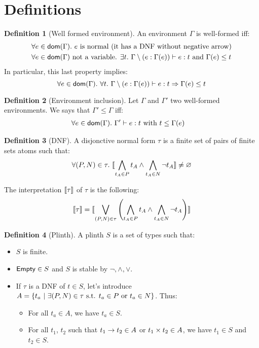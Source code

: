 \documentclass[a4paper]{article}
\theoremstyle{definition}
\newtheorem{definition}{Definition}
\begin{document}
    \section{Definitions}
      
    \begin{definition}[Well formed environment]
      An environment $\Gamma$ is well-formed iff:
      \begin{align*}
        &\forall e \in \textsf{dom}(\Gamma).\ e \text{ is normal (it has a DNF without negative arrow)}\\
        &\forall e \in \textsf{dom}(\Gamma) \text{ not a variable. } \exists t.\ \Gamma\setminus(e:\Gamma(e)) \vdash e : t \text{ and } \Gamma(e) \leq t
      \end{align*}
      In particular, this last property implies:
      \[
        \forall e \in \dom \Gamma.\ \forall t.\ \Gamma\setminus(e:\Gamma(e)) \vdash e : t \Rightarrow \Gamma(e) \leq t
      \]
    \end{definition}
  
    \begin{definition}[Environment inclusion]
      Let $\Gamma$ and $\Gamma'$ two well-formed environments. We says that $\Gamma' \leq \Gamma$ iff:
      \begin{align*}
        &\forall e \in \textsf{dom}(\Gamma).\ \Gamma' \vdash e : t \text{ with } t \leq \Gamma(e)
      \end{align*}
    \end{definition}

    \begin{definition}[DNF]
      A disjonctive normal form $\tau$ is a finite set of pairs of finite sets atoms such that:
      \[ \forall (P,N)\in \tau.\ {\llbracket \bigwedge_{t_A \in P} t_A \land \bigwedge_{t_A \in N} \neg t_A \rrbracket} \neq \varnothing \]

      The interpretation ${\llbracket \tau \rrbracket}$ of $\tau$ is the following:
      \[
        {\llbracket \tau \rrbracket} = {\llbracket \bigvee_{(P,N)\in \tau} \left(\bigwedge_{t_A \in P} t_A \land \bigwedge_{t_A \in N} \neg t_A \right) \rrbracket}
      \]
    \end{definition}
    
    \begin{definition}[Plinth]
      A plinth $S$ is a set of types such that:
      \begin{itemize}
        \item $S$ is finite.
        \item $\textsf{Empty} \in S$ and $S$ is stable by $\neg, \land, \vee$. 
        \item If $\tau$ is a DNF of $t\in S$, let's introduce $A=\{t_a ~|~ \exists (P,N) \in \tau \text{ s.t. } t_a \in P \text{ or } t_a \in N \}$. Thus:
        \begin{itemize}
          \item For all $t_a \in A$, we have $t_a \in S$.
          \item For all $t_1$, $t_2$ such that $t_1\to t_2 \in A$ or $t_1\times t_2 \in A$,
          we have $t_1 \in S$ and $t_2 \in S$.
        \end{itemize}
      \end{itemize}
    \end{definition}
\end{document}
